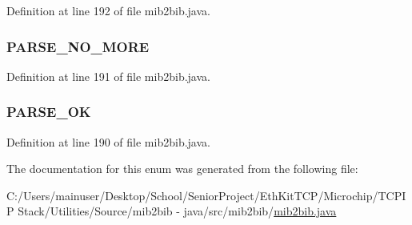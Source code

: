 Definition at line 192 of file mib2bib.\+java.

\hypertarget{enummib2bib_1_1mib2bib_1_1_p_a_r_s_e___r_e_s_u_l_t_a49d5c0305e66bf653c6110e2add14238}{}
\subsubsection[{P\+A\+R\+S\+E\+\_\+\+N\+O\+\_\+\+M\+O\+R\+E}]{\setlength{\rightskip}{0pt plus 5cm}P\+A\+R\+S\+E\+\_\+\+N\+O\+\_\+\+M\+O\+R\+E}\label{enummib2bib_1_1mib2bib_1_1_p_a_r_s_e___r_e_s_u_l_t_a49d5c0305e66bf653c6110e2add14238}


Definition at line 191 of file mib2bib.\+java.

\hypertarget{enummib2bib_1_1mib2bib_1_1_p_a_r_s_e___r_e_s_u_l_t_a4e1f9dd93892440676c62b60e0714d1f}{}
\subsubsection[{P\+A\+R\+S\+E\+\_\+\+O\+K}]{\setlength{\rightskip}{0pt plus 5cm}P\+A\+R\+S\+E\+\_\+\+O\+K}\label{enummib2bib_1_1mib2bib_1_1_p_a_r_s_e___r_e_s_u_l_t_a4e1f9dd93892440676c62b60e0714d1f}


Definition at line 190 of file mib2bib.\+java.



The documentation for this enum was generated from the following file\+:\begin{DoxyCompactItemize}
\item 
C\+:/\+Users/mainuser/\+Desktop/\+School/\+Senior\+Project/\+Eth\+Kit\+T\+C\+P/\+Microchip/\+T\+C\+P\+I\+P Stack/\+Utilities/\+Source/mib2bib -\/ java/src/mib2bib/\hyperlink{mib2bib_8java}{mib2bib.\+java}\end{DoxyCompactItemize}
